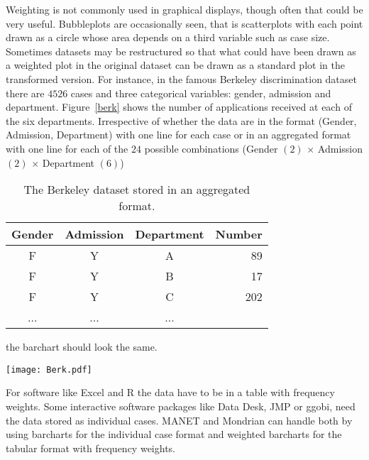 \documentclass{svmult}
\begin{document}
Weighting is not commonly used in graphical displays, though often that could be very useful.  Bubbleplots are occasionally seen, that is scatterplots with each point drawn as a circle whose area depends on a third variable such as case size.  Sometimes datasets may be restructured so that what could have been drawn as a weighted plot in the original dataset can be drawn as a standard plot in the transformed version.  For instance, in the famous Berkeley discrimination dataset \citep{bickel:1975} there are $4526$ cases and three categorical variables: gender, admission and department.  Figure~\ref{berk} shows the number of applications received at each of the six departments. Irrespective of whether the data are in the format (Gender, Admission, Department) with one line for each case or in an aggregated format with one line for each of the $24$ possible combinations (Gender $(2)$ $\times$ Admission $(2)$ $\times$ Department $(6)$)
\begin{table}[h]
\begin{center}
\caption{The Berkeley dataset stored in an aggregated format.}
\begin{tabular}{|c|c|c|r|}
\hline
Gender & Admission & Department & Number\\
\hline
F & Y & A & 89\\
F & Y & B & 17\\
F & Y & C & 202\\
... &... &... &\\
\hline
\end{tabular}
\end{center}
\label{berktab}
\end{table}
the barchart should look the same.

\begin{center}
      \texttt{[image: Berk.pdf]}
      \caption{\label{berk}\em Number of graduate applications to six departments in Berkeley.}
      \end{center}

 For software like Excel and R the data have to be in a table with frequency weights.   Some interactive software packages like Data Desk, JMP or ggobi, need the data stored as individual cases.  MANET and Mondrian can handle both by using barcharts for the individual case format and weighted barcharts for the tabular format with frequency weights.
 
\end{document}

